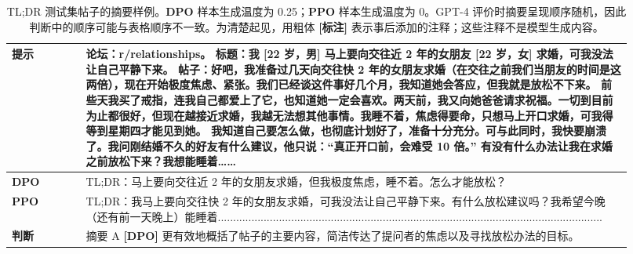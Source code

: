 \begingroup\setlength{\LTcapwidth}{.97\linewidth}
\begin{longtable}{p{0.11\linewidth}p{0.81\linewidth}}
\caption{TL;DR 测试集帖子的摘要样例。\textbf{DPO} 样本生成温度为 0.25；\textbf{PPO} 样本生成温度为 0。GPT-4 评价时摘要呈现顺序随机，因此判断中的顺序可能与表格顺序不一致。为清楚起见，用粗体 \textbf{[标注]} 表示事后添加的注释；这些注释不是模型生成内容。}\label{dpo-tab:summ-ex-2}\\

        \toprule
\textbf{提示} & 论坛：r/relationships。\newline
标题：我 [22 岁，男] 马上要向交往近 2 年的女朋友 [22 岁，女] 求婚，可我没法让自己平静下来。\newline
帖子：好吧，我准备过几天向交往快 2 年的女朋友求婚（在交往之前我们当朋友的时间是这两倍），现在开始极度焦虑、紧张。我们已经谈这件事好几个月，我知道她会答应，但我就是放松不下来。\newline
前些天我买了戒指，连我自己都爱上了它，也知道她一定会喜欢。两天前，我又向她爸爸请求祝福。一切到目前为止都很好，但现在越接近求婚，我越无法想其他事情。我睡不着，焦虑得要命，只想马上开口求婚，可我得等到星期四才能见到她。\newline
我知道自己要怎么做，也彻底计划好了，准备十分充分。可与此同时，我快要崩溃了。我问刚结婚不久的好友有什么建议，他只说：“真正开口前，会难受 10 倍。”\newline
有没有什么办法让我在求婚之前放松下来？我想能睡着……\\
        \midrule
\textbf{DPO} & TL;DR：马上要向交往近 2 年的女朋友求婚，但我极度焦虑，睡不着。怎么才能放松？\\
        \midrule
\textbf{PPO} & TL;DR：我马上要向交往快 2 年的女朋友求婚，可我没法让自己平静下来。有什么放松建议吗？我希望今晚（还有前一天晚上）能睡着........\allowbreak{}........\allowbreak{}........\allowbreak{}........\allowbreak{}........\allowbreak{}........\allowbreak{}........\allowbreak{}........\allowbreak{}........\allowbreak{}........\allowbreak{}........\allowbreak{}........\allowbreak{}........\allowbreak{}........\allowbreak{}........\allowbreak{}......\\
        \midrule
\textbf{判断} & 摘要 A \textbf{[DPO]} 更有效地概括了帖子的主要内容，简洁传达了提问者的焦虑以及寻找放松办法的目标。\\
        \bottomrule
    
\end{longtable}
\endgroup

